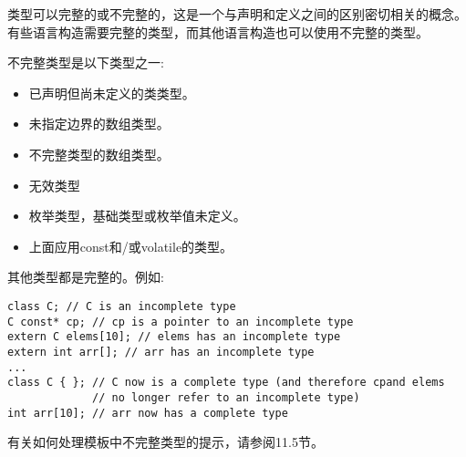 
类型可以完整的或不完整的，这是一个与声明和定义之间的区别密切相关的概念。有些语言构造需要完整的类型，而其他语言构造也可以使用不完整的类型。

不完整类型是以下类型之一:

\begin{itemize}
\item 
已声明但尚未定义的类类型。

\item 
未指定边界的数组类型。

\item 
不完整类型的数组类型。

\item 
无效类型

\item 
枚举类型，基础类型或枚举值未定义。

\item 
上面应用const和/或volatile的类型。
\end{itemize}

其他类型都是完整的。例如:

\begin{lstlisting}[style=styleCXX]
class C; // C is an incomplete type
C const* cp; // cp is a pointer to an incomplete type
extern C elems[10]; // elems has an incomplete type
extern int arr[]; // arr has an incomplete type
...
class C { }; // C now is a complete type (and therefore cpand elems
			 // no longer refer to an incomplete type)
int arr[10]; // arr now has a complete type
\end{lstlisting}

有关如何处理模板中不完整类型的提示，请参阅11.5节。























